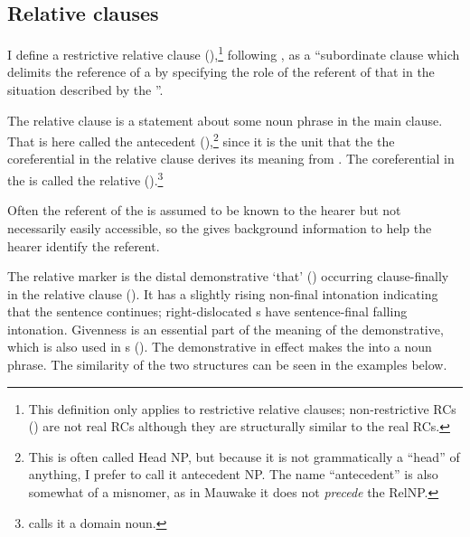 \subsection{Relative clauses} 
\hypertarget{RefHeading23301935131865}{}
I define a restrictive relative clause (),\footnote{This definition only applies to restrictive relative clauses; non-restrictive RCs () are not real RCs although they are structurally similar to the real RCs.} following \citet[206]{Andrews2007b}, as a ``subordinate clause which delimits the reference of a  by specifying the role of the referent of that  in the situation described by the ''. 

The relative clause is a statement about some noun phrase\textstyleAcronymallcaps{} in the main clause. That  is here called the antecedent  (),\footnote{This is often called Head NP, but because it is not grammatically a ``head'' of anything, I prefer to call it antecedent NP. The name ``antecedent'' is also somewhat of a misnomer, as in Mauwake it does not \textit{precede} the RelNP.}  since it is the unit that the the coreferential  in the relative clause derives its meaning from \citep[20]{Crystal1997}. The coreferential  in the  is called the relative  ().\footnote{\citet[142]{Keenan1985} calls it a domain noun.}

Often the referent of the  is assumed to be known to the hearer but not necessarily easily accessible, so the  gives background information to help the hearer identify the referent. 

The relative marker is the distal demonstrative  `that' () occurring clause-finally in the relative clause (). It has a slightly rising non-final intonation indicating that the sentence continues; right-dislocated s have sentence-final falling intonation. Givenness is an essential part of the meaning of the demonstrative, which is also used in s (). The demonstrative in effect makes the  into a noun phrase. The similarity of the two structures can be seen in the examples below.

